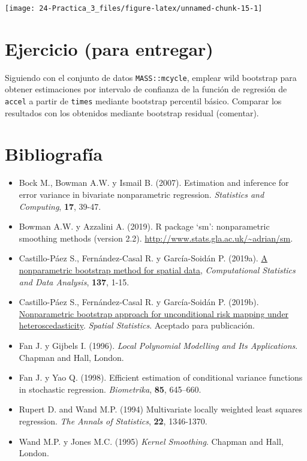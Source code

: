 \documentclass[
]{book}
\theoremstyle{definition}
\theoremstyle{definition}
\theoremstyle{definition}
\theoremstyle{remark}
\begin{document}
\begin{center}\texttt{[image: 24-Practica\_3\_files/figure-latex/unnamed-chunk-15-1]} \end{center}

\hypertarget{ejercicio-para-entregar-3}{%
\section{Ejercicio (para entregar)}\label{ejercicio-para-entregar-3}}

Siguiendo con el conjunto de datos \texttt{MASS::mcycle}, emplear wild bootstrap para
obtener estimaciones por intervalo de confianza de la función de regresión
de \texttt{accel} a partir de \texttt{times} mediante bootstrap percentil básico.
Comparar los resultados con los obtenidos mediante bootstrap residual (comentar).

\hypertarget{bibliografuxeda-1}{%
\section{Bibliografía}\label{bibliografuxeda-1}}

\begin{itemize}
\item
  Bock M., Bowman A.W. y Ismail B. (2007). Estimation and inference for
  error variance in bivariate nonparametric regression. \emph{Statistics and Computing},
  \textbf{17}, 39-47.
\item
  Bowman A.W. y Azzalini A. (2019). R package `sm': nonparametric smoothing methods
  (version 2.2). \url{http://www.stats.gla.ac.uk/~adrian/sm}.
\item
  Castillo-Páez S., Fernández-Casal R. y García-Soidán P. (2019a).
  \href{https://www.sciencedirect.com/science/article/pii/S0167947319300325?via\%3Dihub}{A nonparametric bootstrap method for spatial data},
  \emph{Computational Statistics and Data Analysis}, \textbf{137}, 1-15.
\item
  Castillo-Páez S., Fernández-Casal R. y García-Soidán P. (2019b).
  \href{https://doi.org/10.1016/j.spasta.2019.100389}{Nonparametric bootstrap approach for unconditional risk mapping under heteroscedasticity}.
  \emph{Spatial Statistics}. Aceptado para publicación.
\item
  Fan J. y Gijbels I. (1996). \emph{Local Polynomial Modelling and Its Applications}.
  Chapman and Hall, London.
\item
  Fan J. y Yao Q. (1998). Efficient estimation of conditional variance functions in
  stochastic regression. \emph{Biometrika}, \textbf{85}, 645--660.
\item
  Rupert D. and Wand M.P. (1994) Multivariate locally weighted least squares regression.
  \emph{The Annals of Statistics}, \textbf{22}, 1346-1370.
\item
  Wand M.P. y Jones M.C. (1995) \emph{Kernel Smoothing}. Chapman and Hall, London.
\end{itemize}
\end{document}
